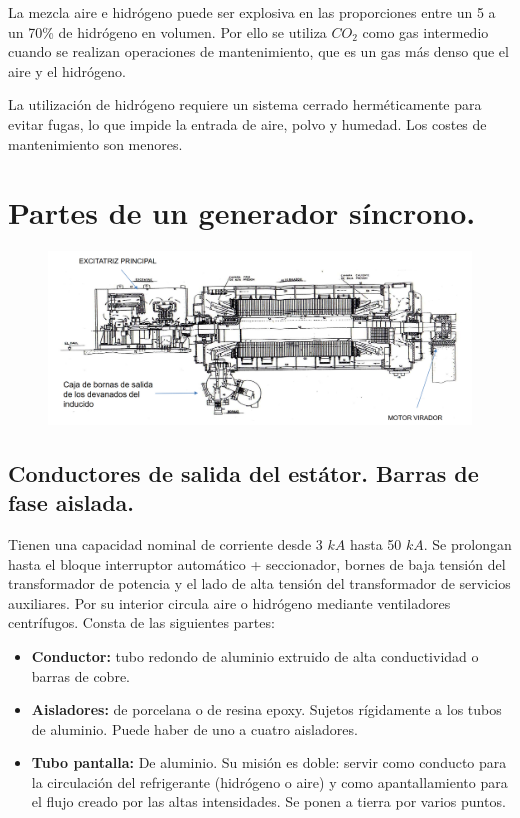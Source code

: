 			
			La mezcla aire e hidrógeno puede ser explosiva en las proporciones entre un 5 a un 70\% de hidrógeno en volumen. Por ello se utiliza $CO_2$ como gas intermedio cuando se realizan operaciones de mantenimiento, que es un gas más denso que el aire y el hidrógeno.
			
			
			La utilización de hidrógeno requiere un sistema cerrado herméticamente para evitar fugas, lo que impide la entrada de aire, polvo y humedad. Los costes de mantenimiento son menores. 
			
	\section{Partes de un generador síncrono.}
		\begin{figure}[H]
			\centering
			\includegraphics[width=0.9\linewidth]{res/tema6/generador}
			\label{fig:generador}
		\end{figure}
		
		\subsection{Conductores de salida del estátor. Barras de fase aislada.}
			Tienen una capacidad nominal de corriente desde 3 $kA$ hasta 50 $kA$. Se prolongan hasta el bloque interruptor automático + seccionador, bornes de baja tensión del transformador de potencia y el lado
			de alta tensión del transformador de servicios auxiliares. Por su interior circula aire o hidrógeno mediante ventiladores centrífugos. Consta de las siguientes partes:
			
			\begin{itemize}
				\item \textbf{Conductor:} tubo redondo de aluminio extruido de alta conductividad o barras de cobre.
				\item \textbf{Aisladores:} de porcelana o de resina epoxy. Sujetos rígidamente a los tubos de aluminio. Puede haber de uno a cuatro aisladores.
				\item \textbf{Tubo pantalla:} De aluminio. Su misión es doble: servir como conducto para la circulación del refrigerante (hidrógeno o aire) y como apantallamiento para el flujo creado por las altas intensidades. Se ponen a tierra por varios puntos.
			\end{itemize}
		

